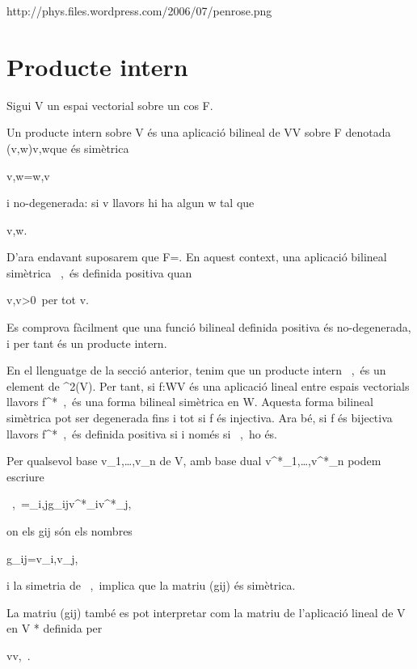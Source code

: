 http://phys.files.wordpress.com/2006/07/penrose.png

\section{Producte intern}

Sigui V un espai vectorial sobre un cos F.

Un producte intern sobre V és una aplicació bilineal de V\times V sobre F denotada (v,w)\mapsto\left\langle v,w\right\rangle que és simètrica

    \left\langle v,w\right\rangle=\left\langle w,v\right\rangle 

i no-degenerada: si v llavors hi ha algun w tal que

    \left\langle v,w\right\rangle{}. 

D'ara endavant suposarem que F=\Reals. En aquest context, una aplicació bilineal simètrica \left\langle\ ,\ \right\rangle és definida positiva quan

    \left\langle v,v\right\rangle>0\qquad\ per tot v. 

Es comprova fàcilment que una funció bilineal definida positiva és no-degenerada, i per tant és un producte intern.

En el llenguatge de la secció anterior, tenim que un producte intern \left\langle\ ,\ \right\rangle és un element de ^2(V). Per tant, si f:W\to V és una aplicació lineal entre espais vectorials llavors f^*\left\langle\ ,\ \right\rangle és una forma bilineal simètrica en W. Aquesta forma bilineal simètrica pot ser degenerada fins i tot si f és injectiva. Ara bé, si f és bijectiva llavors f^*\left\langle\ ,\ \right\rangle és definida positiva si i només si \left\langle\ ,\ \right\rangle ho és.

Per qualsevol base v_1,\dots,v_n de V, amb base dual v^*_1,\dots,v^*_n podem escriure

    \left\langle\ ,\ \right\rangle=\sum_{i,j}g_{ij}v^*_i\otimes v^*_j, 

on els gij són els nombres

    g_{ij}=\left\langle v_i,v_j\right\rangle, 

i la simetria de \left\langle\ ,\ \right\rangle implica que la matriu (gij) és simètrica.

La matriu (gij) també es pot interpretar com la matriu de l'aplicació lineal de V en V * definida per

    v\mapsto\left\langle v,\ \right\rangle. 

